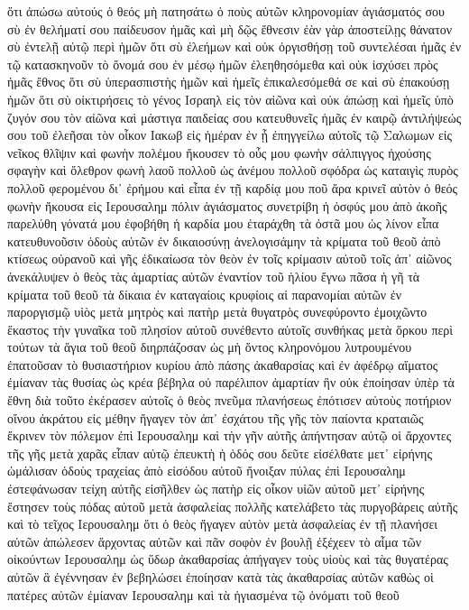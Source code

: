 ὅτι ἀπώσω αὐτούς ὁ θεός μὴ πατησάτω ὁ ποὺς αὐτῶν κληρονομίαν ἁγιάσματός σου
σὺ ἐν θελήματί σου παίδευσον ἡμᾶς καὶ μὴ δῷς ἔθνεσιν
ἐὰν γὰρ ἀποστείλῃς θάνατον σὺ ἐντελῇ αὐτῷ περὶ ἡμῶν
ὅτι σὺ ἐλεήμων καὶ οὐκ ὀργισθήσῃ τοῦ συντελέσαι ἡμᾶς
ἐν τῷ κατασκηνοῦν τὸ ὄνομά σου ἐν μέσῳ ἡμῶν ἐλεηθησόμεθα καὶ οὐκ ἰσχύσει πρὸς ἡμᾶς ἔθνος
ὅτι σὺ ὑπερασπιστὴς ἡμῶν καὶ ἡμεῖς ἐπικαλεσόμεθά σε καὶ σὺ ἐπακούσῃ ἡμῶν
ὅτι σὺ οἰκτιρήσεις τὸ γένος Ισραηλ εἰς τὸν αἰῶνα καὶ οὐκ ἀπώσῃ
καὶ ἡμεῖς ὑπὸ ζυγόν σου τὸν αἰῶνα καὶ μάστιγα παιδείας σου
κατευθυνεῖς ἡμᾶς ἐν καιρῷ ἀντιλήψεώς σου τοῦ ἐλεῆσαι τὸν οἶκον Ιακωβ εἰς ἡμέραν ἐν ᾗ ἐπηγγείλω αὐτοῖς
τῷ Σαλωμων εἰς νεῖκος
θλῖψιν καὶ φωνὴν πολέμου ἤκουσεν τὸ οὖς μου φωνὴν σάλπιγγος ἠχούσης σφαγὴν καὶ ὄλεθρον
φωνὴ λαοῦ πολλοῦ ὡς ἀνέμου πολλοῦ σφόδρα ὡς καταιγὶς πυρὸς πολλοῦ φερομένου δι᾽ ἐρήμου
καὶ εἶπα ἐν τῇ καρδίᾳ μου ποῦ ἄρα κρινεῖ αὐτὸν ὁ θεός
φωνὴν ἤκουσα εἰς Ιερουσαλημ πόλιν ἁγιάσματος
συνετρίβη ἡ ὀσφύς μου ἀπὸ ἀκοῆς παρελύθη γόνατά μου ἐφοβήθη ἡ καρδία μου ἐταράχθη τὰ ὀστᾶ μου ὡς λίνον
εἶπα κατευθυνοῦσιν ὁδοὺς αὐτῶν ἐν δικαιοσύνῃ
ἀνελογισάμην τὰ κρίματα τοῦ θεοῦ ἀπὸ κτίσεως οὐρανοῦ καὶ γῆς ἐδικαίωσα τὸν θεὸν ἐν τοῖς κρίμασιν αὐτοῦ τοῖς ἀπ᾽ αἰῶνος
ἀνεκάλυψεν ὁ θεὸς τὰς ἁμαρτίας αὐτῶν ἐναντίον τοῦ ἡλίου ἔγνω πᾶσα ἡ γῆ τὰ κρίματα τοῦ θεοῦ τὰ δίκαια
ἐν καταγαίοις κρυφίοις αἱ παρανομίαι αὐτῶν ἐν παροργισμῷ υἱὸς μετὰ μητρὸς καὶ πατὴρ μετὰ θυγατρὸς συνεφύροντο
ἐμοιχῶντο ἕκαστος τὴν γυναῖκα τοῦ πλησίον αὐτοῦ συνέθεντο αὑτοῖς συνθήκας μετὰ ὅρκου περὶ τούτων
τὰ ἅγια τοῦ θεοῦ διηρπάζοσαν ὡς μὴ ὄντος κληρονόμου λυτρουμένου
ἐπατοῦσαν τὸ θυσιαστήριον κυρίου ἀπὸ πάσης ἀκαθαρσίας καὶ ἐν ἀφέδρῳ αἵματος ἐμίαναν τὰς θυσίας ὡς κρέα βέβηλα
οὐ παρέλιπον ἁμαρτίαν ἣν οὐκ ἐποίησαν ὑπὲρ τὰ ἔθνη
διὰ τοῦτο ἐκέρασεν αὐτοῖς ὁ θεὸς πνεῦμα πλανήσεως ἐπότισεν αὐτοὺς ποτήριον οἴνου ἀκράτου εἰς μέθην
ἤγαγεν τὸν ἀπ᾽ ἐσχάτου τῆς γῆς τὸν παίοντα κραταιῶς ἔκρινεν τὸν πόλεμον ἐπὶ Ιερουσαλημ καὶ τὴν γῆν αὐτῆς
ἀπήντησαν αὐτῷ οἱ ἄρχοντες τῆς γῆς μετὰ χαρᾶς εἶπαν αὐτῷ ἐπευκτὴ ἡ ὁδός σου δεῦτε εἰσέλθατε μετ᾽ εἰρήνης
ὡμάλισαν ὁδοὺς τραχείας ἀπὸ εἰσόδου αὐτοῦ ἤνοιξαν πύλας ἐπὶ Ιερουσαλημ ἐστεφάνωσαν τείχη αὐτῆς
εἰσῆλθεν ὡς πατὴρ εἰς οἶκον υἱῶν αὐτοῦ μετ᾽ εἰρήνης ἔστησεν τοὺς πόδας αὐτοῦ μετὰ ἀσφαλείας πολλῆς
κατελάβετο τὰς πυργοβάρεις αὐτῆς καὶ τὸ τεῖχος Ιερουσαλημ ὅτι ὁ θεὸς ἤγαγεν αὐτὸν μετὰ ἀσφαλείας ἐν τῇ πλανήσει αὐτῶν
ἀπώλεσεν ἄρχοντας αὐτῶν καὶ πᾶν σοφὸν ἐν βουλῇ ἐξέχεεν τὸ αἷμα τῶν οἰκούντων Ιερουσαλημ ὡς ὕδωρ ἀκαθαρσίας
ἀπήγαγεν τοὺς υἱοὺς καὶ τὰς θυγατέρας αὐτῶν ἃ ἐγέννησαν ἐν βεβηλώσει
ἐποίησαν κατὰ τὰς ἀκαθαρσίας αὐτῶν καθὼς οἱ πατέρες αὐτῶν ἐμίαναν Ιερουσαλημ καὶ τὰ ἡγιασμένα τῷ ὀνόματι τοῦ θεοῦ

